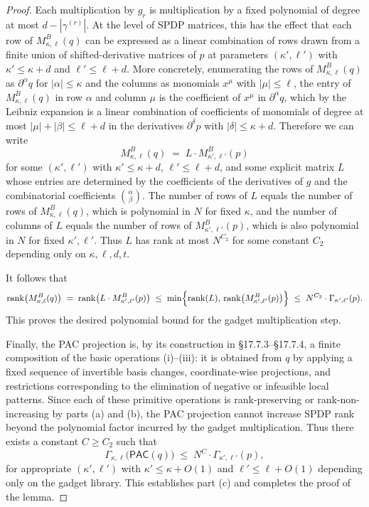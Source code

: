 \documentclass[12pt]{article}
\theoremstyle{definition}
\theoremstyle{definition}
\theoremstyle{remark}
\theoremstyle{remark}
\begin{document}
\begin{proof}
Each multiplication by $g_r$ is multiplication by a fixed polynomial of
degree at most $d-|\gamma^{(r)}|$. At the level of SPDP matrices, this
has the effect that each row of $M^{B}_{\kappa,\ell}(q)$ can be expressed as a
linear combination of rows drawn from a finite union of shifted-derivative
matrices of $p$ at parameters $(\kappa',\ell')$ with $\kappa'\le \kappa+d$ and
$\ell'\le \ell + d$. More concretely, enumerating the rows of
$M^{B}_{\kappa,\ell}(q)$ as
$\partial^\alpha q$ for $|\alpha|\le \kappa$ and the columns as monomials
$x^\mu$ with $|\mu|\le \ell$, the entry of $M^{B}_{\kappa,\ell}(q)$ in row
$\alpha$ and column $\mu$ is the coefficient of $x^\mu$ in
$\partial^\alpha q$, which by the Leibniz expansion is a linear
combination of coefficients of monomials of degree at most
$|\mu| + |\beta|\le \ell + d$ in the derivatives $\partial^\delta p$ with
$|\delta|\le \kappa+d$. Therefore we can write
\[
   M^{B}_{\kappa,\ell}(q)
   \;=\; L \cdot M^{B}_{\kappa',\ell'}(p)
\]
for some $(\kappa',\ell')$ with $\kappa'\le \kappa+d$, $\ell'\le \ell+d$, and some
explicit matrix $L$ whose entries are determined by the coefficients of
the derivatives of $g$ and the combinatorial coefficients
${\alpha\choose\beta}$. The number of rows of $L$ equals the number of
rows of $M^{B}_{\kappa,\ell}(q)$, which is polynomial in $N$ for fixed $\kappa$,
and the number of columns of $L$ equals the number of rows of
$M^{B}_{\kappa',\ell'}(p)$, which is also polynomial in $N$ for fixed $\kappa',\ell'$.
Thus $L$ has rank at most $N^{C_2}$ for some constant $C_2$ depending
only on $\kappa,\ell,d,t$.

It follows that
\[
   \mathrm{rank}\bigl(M^{B}_{\kappa,\ell}(q)\bigr)
   \;=\; \mathrm{rank}\bigl(L \cdot M^{B}_{\kappa',\ell'}(p)\bigr)
   \;\le\; \min\Bigl\{\mathrm{rank}(L),\,
                      \mathrm{rank}\bigl(M^{B}_{\kappa',\ell'}(p)\bigr)\Bigr\}
   \;\le\; N^{C_2}\cdot \Gamma_{\kappa',\ell'}(p).
\]
This proves the desired polynomial bound for the gadget multiplication
step.

Finally, the PAC projection is, by its construction in
\S17.7.3--\S17.7.4, a finite composition of the basic
operations (i)--(iii): it is obtained from $q$ by applying a fixed
sequence of invertible basis changes, coordinate-wise projections, and
restrictions corresponding to the elimination of negative or
infeasible local patterns. Since each of these primitive operations is
rank-preserving or rank-non-increasing by parts (a) and (b), the PAC
projection cannot increase SPDP rank beyond the polynomial factor
incurred by the gadget multiplication. Thus there exists a constant
$C\ge C_2$ such that
\[
   \Gamma_{\kappa,\ell}\bigl(\mathsf{PAC}(q)\bigr)
   \;\le\; N^{C} \cdot \Gamma_{\kappa',\ell'}(p),
\]
for appropriate $(\kappa',\ell')$ with $\kappa'\le \kappa+O(1)$ and $\ell'\le \ell+O(1)$
depending only on the gadget library. This establishes part (c) and
completes the proof of the lemma.
\end{proof}
\end{document}
